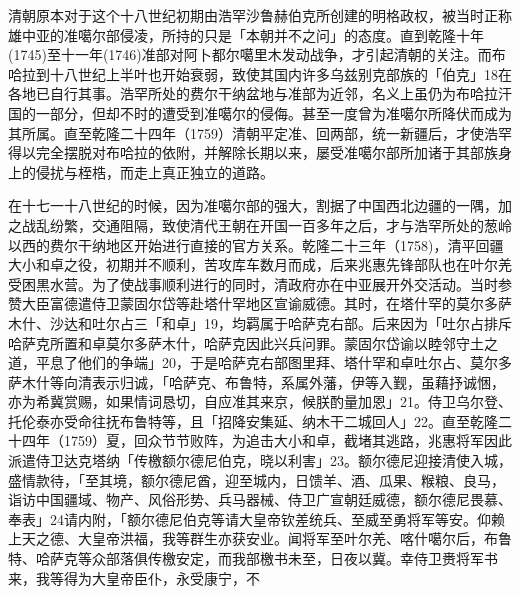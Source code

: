 清朝原本对于这个十八世纪初期由浩罕沙鲁赫伯克所创建的明格政权，被当时正称雄中亚的准噶尔部侵凌，所持的只是「本朝并不之问」的态度。直到乾隆十年(1745)至十一年(1746)准部对阿卜都尔噶里木发动战争，才引起清朝的关注。而布哈拉到十八世纪上半叶也开始衰弱，致使其国内许多乌兹别克部族的「伯克」18在各地已自行其事。浩罕所处的费尔干纳盆地与准部为近邻，名义上虽仍为布哈拉汗国的一部分，但却不时的遭受到准噶尔的侵侮。甚至一度曾为准噶尔所降伏而成为其所属。直至乾隆二十四年（1759）清朝平定准、回两部，统一新疆后，才使浩罕得以完全摆脱对布哈拉的依附，并解除长期以来，屡受准噶尔部所加诸于其部族身上的侵扰与桎梏，而走上真正独立的道路。

\vfill
\begin{BookNotes}
\end{BookNotes}


在十七一十八世纪的时候，因为准噶尔部的强大，割据了中国西北边疆的一隅，加之战乱纷繁，交通阻隔，致使清代王朝在开国一百多年之后，才与浩罕所处的葱岭以西的费尔干纳地区开始进行直接的官方关系。乾隆二十三年（1758)，清平回疆大小和卓之役，初期并不顺利，苦攻库车数月而成，后来兆惠先锋部队也在叶尔羌受困黒水营。为了使战事顺利进行的同时，清政府亦在中亚展开外交活动。当时参赞大臣富德遣侍卫蒙固尔岱等赴塔什罕地区宣谕威德。其时，在塔什罕的莫尔多萨木什、沙达和吐尔占三「和卓」19，均羁属于哈萨克右部。后来因为「吐尔占排斥哈萨克所置和卓莫尔多萨木什，哈萨克因此兴兵问罪。蒙固尔岱谕以睦邻守土之道，平息了他们的争端」20，于是哈萨克右部图里拜、塔什罕和卓吐尔占、莫尔多萨木什等向清表示归诚，「哈萨克、布鲁特，系属外藩，伊等入觐，虽藉抒诚悃，亦为希冀赏赐，如果情词恳切，自应准其来京，候朕酌量加恩」21。侍卫乌尔登、托伦泰亦受命往抚布鲁特等，且「招降安集延、纳木干二城回人」22。直至乾隆二十四年（1759）夏，回众节节败阵，为追击大小和卓，截堵其逃路，兆惠将军因此派遣侍卫达克塔纳「传檄额尔德尼伯克，晓以利害」23。额尔德尼迎接清使入城，盛情款待，「至其境，额尔德尼酋，迎至城内，日馈羊、酒、瓜果、糇粮、良马，诣访中国疆域、物产、风俗形势、兵马器械、侍卫广宣朝廷威德，额尔德尼畏慕、奉表」24请内附，「额尔德尼伯克等请大皇帝钦差统兵、至威至勇将军等安。仰赖上天之德、大皇帝洪福，我等群生亦获安业。闻将军至叶尔羌、喀什噶尔后，布鲁特、哈萨克等众部落俱传檄安定，而我部檄书未至，日夜以冀。幸侍卫赉将军书来，我等得为大皇帝臣仆，永受康宁，不

